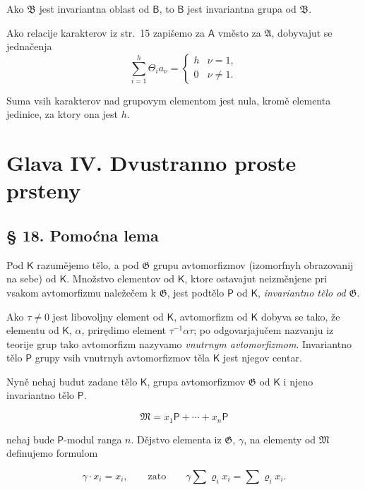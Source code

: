\documentclass[11pt]{article}
\begin{document}
Ako \(\mathfrak B\) jest invariantna oblast od \(\mathsf B\), to \(\mathsf B\) jest invariantna grupa od \(\mathfrak B\).

Ako relacije karakterov iz str.~15 zapišemo za \(\mathsf A\) vměsto za \(\mathfrak A\), dobyvajut se jednačenja
\[
\sum_{i=1}^{h} \Theta_i a_\nu =
\begin{cases}
h & \nu=1,\\
0 & \nu\ne 1.
\end{cases}
\]

Suma vsih karakterov nad grupovym elementom jest nula, kromě elementa jedinice, za ktory ona jest \(h\).

\section*{Glava IV. Dvustranno proste prsteny}\label{kapitel-iv.-zweiseitig-einfache-ringe}

\subsection*{§ 18. Pomoćna lema}\label{ein-hilfssatz}

Pod \(\mathsf K\) razumějemo tělo, a pod \(\mathfrak G\) grupu avtomorfizmov (izomorfnyh obrazovanij na sebe) od \(\mathsf K\). Množstvo elementov od \(\mathsf K\), ktore ostavajut neizměnjene pri vsakom avtomorfizmu naležečem k \(\mathfrak G\), jest podtělo \(\mathsf P\) od \(\mathsf K\), \emph{invariantno tělo od} \(\mathfrak G\).

Ako \(\tau\ne 0\) jest libovoljny element od \(\mathsf K\), avtomorfizm od \(\mathsf K\) dobyva se tako, že elementu od \(\mathsf K\), \(\alpha\), prirędimo element \(\tau^{-1}\alpha\tau\); po odgovarjajučem nazvanju iz teorije grup tako avtomorfizm nazyvamo \emph{vnutrnym avtomorfizmom}. Invariantno tělo \(\mathsf P\) grupy vsih vnutrnyh avtomorfizmov těla \(\mathsf K\) jest njegov centar.

Nyně nehaj budut zadane tělo \(\mathsf K\), grupa avtomorfizmov \(\mathfrak G\) od \(\mathsf K\) i njeno invariantno tělo \(\mathsf P\).

\[
\mathfrak M=x_1\mathsf P+\cdots+x_n\mathsf P
\]

nehaj bude \(\mathsf P\)-modul ranga \(n\). Dějstvo elementa iz \(\mathfrak G\), \(\gamma\), na elementy od \(\mathfrak M\) definujemo formulom

\[
\gamma\cdot x_i=x_i,\qquad\text{zato}\qquad
\gamma\sum \varrho_i x_i=\sum \varrho_i x_i.
\]
\end{document}
